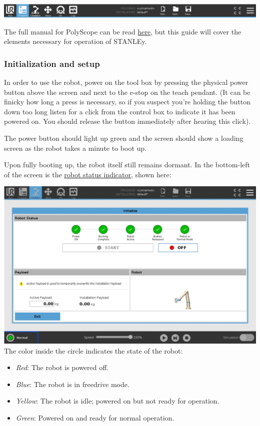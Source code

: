 \documentclass[11pt]{article}
\begin{document}
\begin{center}
\includegraphics*[width=.9\linewidth]{figures/menu_banner.jpg}
\end{center}

The full manual for PolyScope can be read \hyperlink{https://s3-eu-west-1.amazonaws.com/ur-support-site/114079/99403_UR3e_User_Manual_en_Global.pdf\#page=107\&zoom=100,76,233}{here}, but this guide will cover the elements necessary for operation of STANLEy.

\subsubsection{Initialization and setup}
In order to use the robot, power on the tool box by pressing the physical power button above the screen and next to the e-stop on the teach pendant. 
(It can be finicky how long a press is necessary, so if you suspect you're holding the button down too long listen for a click from the control box to indicate it has been powered on. You should release the button immediately after hearing this click).

The power button should light up green and the screen should show a loading screen as the robot takes a minute to boot up.

Upon fully booting up, the robot itself still remains dormant. In the bottom-left of the screen is the \uline{robot status indicator}, shown here:

\begin{center}
\includegraphics[width=.9\linewidth]{figures/robot_state_menu.jpg}
The color inside the circle indicates the state of the robot:
\end{center}
\begin{itemize}
    \item \emph{Red}: The robot is powered off.
    \item \emph{Blue}: The robot is in freedrive mode.
    \item \emph{Yellow}: The robot is idle; powered on but not ready for operation.
    \item \emph{Green}: Powered on and ready for normal operation.
\end{itemize}
\end{document}
